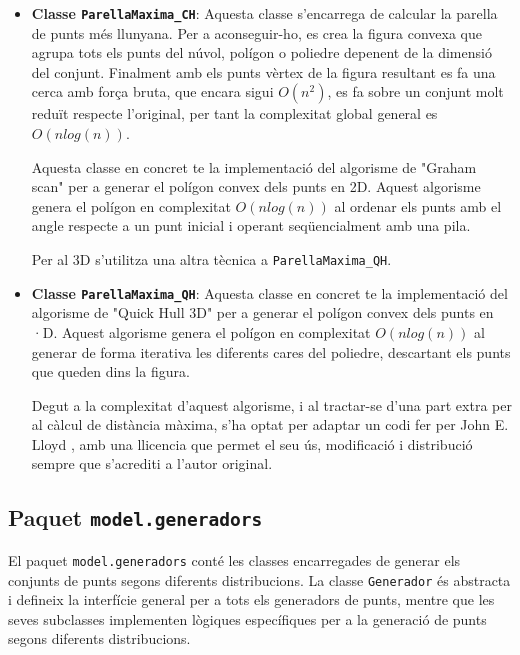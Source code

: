 \documentclass{ieeetj}
\begin{document}
\begin{itemize}
\item \textbf{Classe \texttt{ParellaMaxima\_CH}}: Aquesta classe s'encarrega de calcular la parella de punts més llunyana. Per a aconseguir-ho, es crea la figura convexa que agrupa tots els punts del núvol, polígon o poliedre depenent de la dimensió del conjunt. Finalment amb els punts vèrtex de la figura resultant es fa una cerca amb força bruta, que encara sigui \(O(n^2)\), es fa sobre un conjunt molt reduït respecte l'original, per tant la complexitat global general es \(O(nlog(n))\).

Aquesta classe en concret te la implementació del algorisme de "Graham scan" \cite{GrahamScan} per a generar el polígon convex dels punts en 2D. Aquest algorisme genera el polígon en complexitat \(O(nlog(n))\) al ordenar els punts amb el angle respecte a un punt inicial i operant seqüencialment amb una pila.

Per al 3D s'utilitza una altra tècnica a \texttt{ParellaMaxima\_QH}.

\end{itemize}

\begin{itemize}
\item \textbf{Classe \texttt{ParellaMaxima\_QH}}: 
Aquesta classe en concret te la implementació del algorisme de "Quick Hull 3D" \cite{quickhull} per a generar el polígon convex dels punts en ·D. Aquest algorisme genera el polígon en complexitat \(O(nlog(n))\) al generar de forma iterativa les diferents cares del poliedre, descartant els punts que queden dins la figura.

Degut a la complexitat d'aquest algorisme, i al tractar-se d'una part extra per al càlcul de distància màxima, s'ha optat per adaptar un codi fer per John E. Lloyd \cite{John}, amb una llicencia que permet el seu ús, modificació i distribució sempre que s'acrediti a l'autor original.

\end{itemize}



\subsection{Paquet \texttt{model.generadors}}

El paquet \texttt{model.generadors} conté les classes encarregades de generar els conjunts de punts segons diferents distribucions. La classe \texttt{Generador} és abstracta i defineix la interfície general per a tots els generadors de punts, mentre que les seves subclasses implementen lògiques específiques per a la generació de punts segons diferents distribucions.
\end{document}
